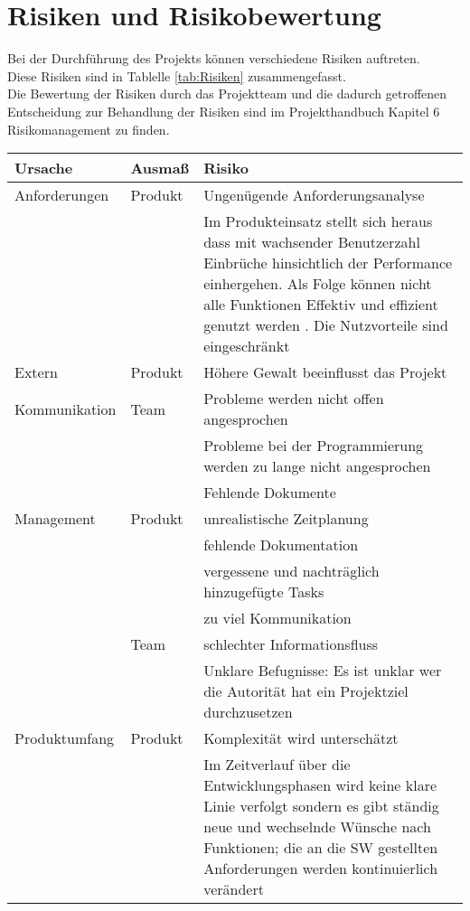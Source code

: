 \chapter{Risiken und Risikobewertung}
Bei der Durchführung des Projekts können verschiedene Risiken auftreten. \\
Diese Risiken sind in Tablelle \ref{tab:Risiken} zusammengefasst. \\
Die Bewertung der Risiken durch das Projektteam und die dadurch getroffenen Entscheidung zur Behandlung der Risiken sind im Projekthandbuch Kapitel 6 Risikomanagement zu finden.
\begin{table}
\centering
\scriptsize
\begin{tabularx}{\textwidth}{|l|l|X|} 
\hline
\textbf{Ursache} & \textbf{Ausmaß} & \textbf{Risiko} \\
\hline
Anforderungen & Produkt & Ungenügende Anforderungsanalyse  \\ 
\hline
 &  & Im Produkteinsatz stellt sich heraus  dass mit wachsender Benutzerzahl Einbrüche hinsichtlich der Performance einhergehen. Als Folge können nicht alle Funktionen Effektiv und effizient genutzt werden . Die Nutzvorteile sind eingeschränkt  \\ 
\hline
Extern & Produkt & Höhere Gewalt beeinflusst das Projekt  \\ 
\hline
Kommunikation & Team & Probleme werden nicht offen angesprochen \\ 
\hline
 &  & Probleme bei der Programmierung werden zu lange nicht angesprochen \\ 
\hline
 &  & Fehlende Dokumente\\ 
\hline
Management & Produkt & unrealistische Zeitplanung \\ 
\hline
 &  & fehlende Dokumentation \\ 
\hline
 &  & vergessene und nachträglich hinzugefügte Tasks \\ 
\hline
 &  & zu viel Kommunikation\\ 
\hline
 & Team & schlechter Informationsfluss \\ 
\hline
 &  & Unklare Befugnisse: Es ist unklar wer die Autorität hat ein Projektziel durchzusetzen  \\ 
\hline
Produktumfang & Produkt & Komplexität wird unterschätzt \\ 
\hline
 &  & Im Zeitverlauf über die Entwicklungsphasen wird keine klare Linie verfolgt sondern es gibt ständig neue und wechselnde Wünsche nach Funktionen; die an die SW gestellten Anforderungen werden kontinuierlich verändert\\ 

\end{tabularx}
\end{table}
